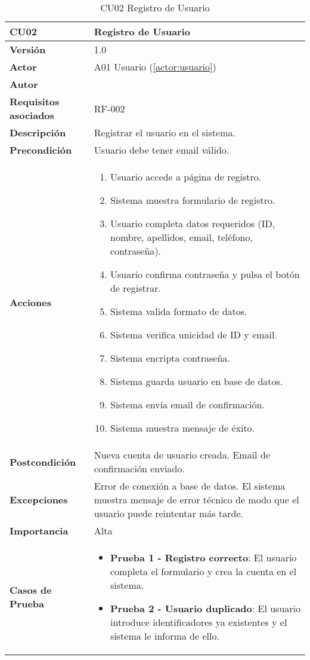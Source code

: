 \begin{table}[H]
	\centering
	\begin{tabularx}{\linewidth}{ p{} p{} }
		\toprule
		\textbf{CU02}    & \textbf{Registro de Usuario} \\
		\toprule
		\textbf{Versión}              & 1.0    \\
		\textbf{Actor}                & A01 Usuario (\ref{actor:usuario}) \\
		\textbf{Autor}                & \nombre \\
		\textbf{Requisitos asociados} & RF-002 \\
		\textbf{Descripción}          & Registrar el usuario en el sistema. \\
		\textbf{Precondición}         & Usuario debe tener email válido. \\
		\textbf{Acciones}             &
		\begin{enumerate}
			\def\labelenumi{\arabic{enumi}.}
			\tightlist
			\item Usuario accede a página de registro.
            \item Sistema muestra formulario de registro.
            \item Usuario completa datos requeridos (ID, nombre, apellidos, email, teléfono, contraseña).
            \item Usuario confirma contraseña y pulsa el botón de registrar.
            \item Sistema valida formato de datos.
            \item Sistema verifica unicidad de ID y email.
            \item Sistema encripta contraseña.
            \item Sistema guarda usuario en base de datos.
            \item Sistema envía email de confirmación.
            \item Sistema muestra mensaje de éxito.
		\end{enumerate}\\
		\textbf{Postcondición}        & Nueva cuenta de usuario creada. Email de confirmación enviado.\\
		\textbf{Excepciones}          & Error de conexión a base de datos. El sistema muestra mensaje de error técnico de modo que el usuario puede reintentar más tarde.\\
		\textbf{Importancia}          & Alta \\
		\textbf{Casos de Prueba}      &
		\begin{itemize}
			\item \textbf{Prueba 1 - Registro correcto}: El usuario completa el formulario y crea la cuenta en el sistema.
			\item \textbf{Prueba 2 - Usuario duplicado}: El usuario introduce identificadores ya existentes y el sistema le informa de ello.
		\end{itemize} \\
		\bottomrule
	\end{tabularx}
	\caption{CU02 Registro de Usuario}
	\label{cu:registro-usuario}
\end{table}

